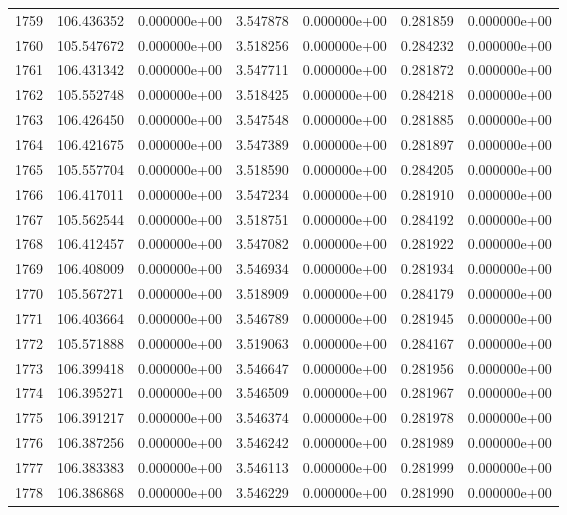 \begin{tabular}{rrrrrrr}
1759 & 106.436352 &  0.000000e+00 &  3.547878 &  0.000000e+00 &    0.281859 &  0.000000e+00 \\
1760 & 105.547672 &  0.000000e+00 &  3.518256 &  0.000000e+00 &    0.284232 &  0.000000e+00 \\
1761 & 106.431342 &  0.000000e+00 &  3.547711 &  0.000000e+00 &    0.281872 &  0.000000e+00 \\
1762 & 105.552748 &  0.000000e+00 &  3.518425 &  0.000000e+00 &    0.284218 &  0.000000e+00 \\
1763 & 106.426450 &  0.000000e+00 &  3.547548 &  0.000000e+00 &    0.281885 &  0.000000e+00 \\
1764 & 106.421675 &  0.000000e+00 &  3.547389 &  0.000000e+00 &    0.281897 &  0.000000e+00 \\
1765 & 105.557704 &  0.000000e+00 &  3.518590 &  0.000000e+00 &    0.284205 &  0.000000e+00 \\
1766 & 106.417011 &  0.000000e+00 &  3.547234 &  0.000000e+00 &    0.281910 &  0.000000e+00 \\
1767 & 105.562544 &  0.000000e+00 &  3.518751 &  0.000000e+00 &    0.284192 &  0.000000e+00 \\
1768 & 106.412457 &  0.000000e+00 &  3.547082 &  0.000000e+00 &    0.281922 &  0.000000e+00 \\
1769 & 106.408009 &  0.000000e+00 &  3.546934 &  0.000000e+00 &    0.281934 &  0.000000e+00 \\
1770 & 105.567271 &  0.000000e+00 &  3.518909 &  0.000000e+00 &    0.284179 &  0.000000e+00 \\
1771 & 106.403664 &  0.000000e+00 &  3.546789 &  0.000000e+00 &    0.281945 &  0.000000e+00 \\
1772 & 105.571888 &  0.000000e+00 &  3.519063 &  0.000000e+00 &    0.284167 &  0.000000e+00 \\
1773 & 106.399418 &  0.000000e+00 &  3.546647 &  0.000000e+00 &    0.281956 &  0.000000e+00 \\
1774 & 106.395271 &  0.000000e+00 &  3.546509 &  0.000000e+00 &    0.281967 &  0.000000e+00 \\
1775 & 106.391217 &  0.000000e+00 &  3.546374 &  0.000000e+00 &    0.281978 &  0.000000e+00 \\
1776 & 106.387256 &  0.000000e+00 &  3.546242 &  0.000000e+00 &    0.281989 &  0.000000e+00 \\
1777 & 106.383383 &  0.000000e+00 &  3.546113 &  0.000000e+00 &    0.281999 &  0.000000e+00 \\
1778 & 106.386868 &  0.000000e+00 &  3.546229 &  0.000000e+00 &    0.281990 &  0.000000e+00 \\

\end{tabular}
